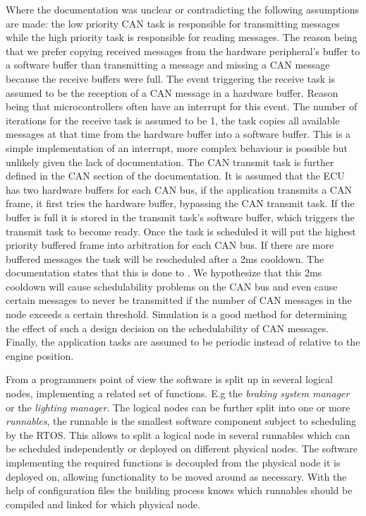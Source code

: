 Where the documentation was unclear or contradicting the following assumptions are made: the low priority CAN task is responsible for transmitting messages while the high priority task is responsible for reading messages. The reason being that we prefer copying received messages from the hardware peripheral's buffer to a software buffer than transmitting a message and missing a CAN message because the receive buffers were full. The event triggering the receive task is assumed to be the reception of a CAN message in a hardware buffer. Reason being that microcontrollers often have an interrupt for this event. The number of iterations for the receive task is assumed to be 1, the task copies all available messages at that time from the hardware buffer into a software buffer. This is a simple implementation of an interrupt, more complex behaviour is possible but unlikely given the lack of documentation. The CAN transmit task is further defined in the CAN section of the documentation. It is assumed that the ECU has two hardware buffers for each CAN bus, if the application transmits a CAN frame, it first tries the hardware buffer, bypassing the CAN transmit task. If the buffer is full it is stored in the transmit task's software buffer, which triggers the transmit task to become ready. Once the task is scheduled it will put the highest priority buffered frame into arbitration for each CAN bus. If there are more buffered messages the task will be rescheduled after a 2ms cooldown. The documentation states that this is done to . We hypothesize that this 2ms cooldown will cause schedulability problems on the CAN bus and even cause certain messages to never be transmitted if the number of CAN messages in the node exceeds a certain threshold. Simulation is a good method for determining the effect of such a design decision on the schedulability of CAN messages. Finally, the application tasks are assumed to be periodic instead of relative to the engine position.

From a programmers point of view the software is split up in several logical nodes, implementing a related set of functions. E.g the \textit{braking system manager} or the \textit{lighting manager}. The logical nodes can be further split into one or more \textit{runnables}, the runnable is the smallest software component subject to scheduling by the RTOS. This allows to split a logical node in several runnables which can be scheduled independently or deployed on different physical nodes. The software implementing the required functions is decoupled from the physical node it is deployed on, allowing functionality to be moved around as necessary. With the help of configuration files the building process knows which runnables should be compiled and linked for which physical node.

